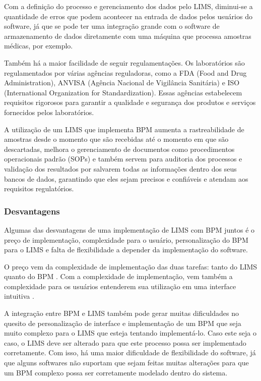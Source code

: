 Com a definição do processo e gerenciamento dos dados pelo LIMS, diminui-se a quantidade de erros que podem acontecer na entrada de dados pelos usuários do software, já que se pode ter uma integração grande com o software de armazenamento de dados diretamente com uma máquina que processa amostras médicas, por exemplo.

Também há a maior facilidade de seguir regulamentações. Os laboratórios são regulamentados por várias agências reguladoras, como a FDA (Food and Drug Administration), ANVISA (Agência Nacional de Vigilância Sanitária) e ISO (International Organization for Standardization). Essas agências estabelecem requisitos rigorosos para garantir a qualidade e segurança dos produtos e serviços fornecidos pelos laboratórios.

A utilização de um LIMS que implementa BPM aumenta a rastreabilidade de amostras desde o momento que são recebidas até o momento em que são descartadas, melhora o gerenciamento de documentos como procedimentos operacionais padrão (SOPs) e também servem para auditoria dos processos e validação dos resultados por salvarem todas as informações dentro dos seus bancos de dados, garantindo que eles sejam precisos e confiáveis e atendam aos requisitos regulatórios.


\subsubsection{Desvantagens}

Algumas das desvantagens de uma implementação de LIMS com BPM juntos é o preço de implementação, complexidade para o usuário, personalização do BPM para o LIMS e falta de flexibilidade a depender da implementação do software.

O preço vem da complexidade de implementação das duas tarefas: tanto do LIMS quanto do BPM \R. Com a complexidade de implementação, vem também a complexidade para os usuários entenderem sua utilização em uma interface intuitiva \R.

A integração entre BPM e LIMS também pode gerar muitas dificuldades no quesito de personalização de interface e implementação de um BPM que seja muito complexo para o LIMS que esteja tentando implementá-lo. Caso este seja o caso, o LIMS deve ser alterado para que este processo possa ser implementado corretamente. Com isso, há uma maior dificuldade de flexibilidade do software, já que alguns softwares não suportam que sejam feitas muitas alterações para que um BPM complexo possa ser corretamente modelado dentro do sistema.